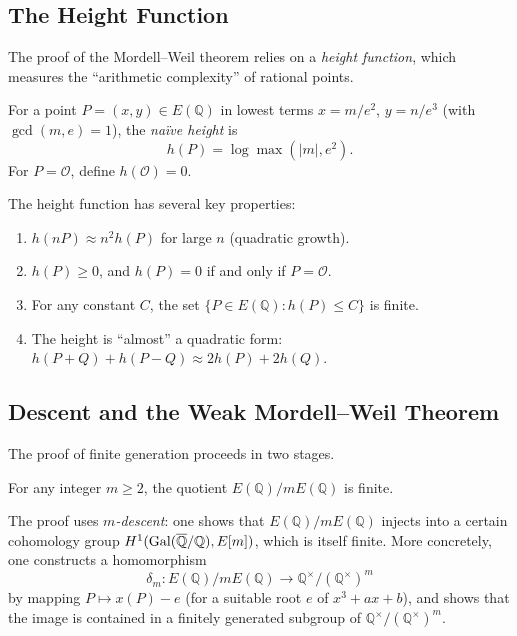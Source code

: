 \subsection{The Height Function}

The proof of the Mordell--Weil theorem relies on a \emph{height function}, which measures the ``arithmetic complexity'' of rational points.

\begin{definition}
For a point $P = (x, y) \in E(\mathbb{Q})$ in lowest terms $x = m/e^2$, $y = n/e^3$ (with $\gcd(m, e) = 1$), the \textit{naïve height} is
\[
h(P) = \log \max(|m|, e^2).
\]
For $P = \mathcal{O}$, define $h(\mathcal{O}) = 0$.
\end{definition}

The height function has several key properties:
\begin{enumerate}
\item $h(nP) \approx n^2 h(P)$ for large $n$ (quadratic growth).
\item $h(P) \ge 0$, and $h(P) = 0$ if and only if $P = \mathcal{O}$.
\item For any constant $C$, the set $\{P \in E(\mathbb{Q}) : h(P) \le C\}$ is finite.
\item The height is ``almost'' a quadratic form: $h(P + Q) + h(P - Q) \approx 2h(P) + 2h(Q)$.
\end{enumerate}

\subsection{Descent and the Weak Mordell--Weil Theorem}

The proof of finite generation proceeds in two stages.

\begin{theorem}
For any integer $m \ge 2$, the quotient $E(\mathbb{Q})/mE(\mathbb{Q})$ is finite.
\end{theorem}

The proof uses \emph{$m$-descent}: one shows that $E(\mathbb{Q})/mE(\mathbb{Q})$ injects into a certain cohomology group $H^1(\operatorname{Gal}(\overline{\mathbb{Q}}/\mathbb{Q}), E[m])$, which is itself finite. More concretely, one constructs a homomorphism
\[
\delta_m: E(\mathbb{Q})/mE(\mathbb{Q}) \longrightarrow \mathbb{Q}^\times / (\mathbb{Q}^\times)^m
\]
by mapping $P \mapsto x(P) - e$ (for a suitable root $e$ of $x^3 + ax + b$), and shows that the image is contained in a finitely generated subgroup of $\mathbb{Q}^\times/(\mathbb{Q}^\times)^m$.

